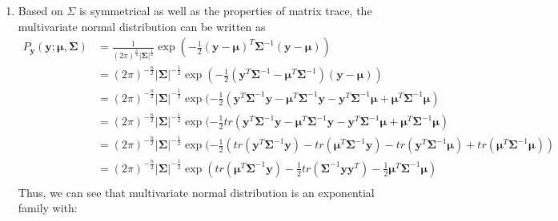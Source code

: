 \documentclass[a4paper]{article}
\begin{document}
\begin{enumerate}
\item Based on $\Sigma$ is symmetrical as well as the properties of matrix trace, the multivariate normal distribution can be written as
\begin{equation*}
  \begin{aligned}
    P_{\boldsymbol y}(\boldsymbol y;\boldsymbol \mu,\boldsymbol \Sigma)
    &= \frac{1}{(2\pi)^{\frac{n}{2}}|\boldsymbol \Sigma|^{\frac{1}{2}}} \exp(-\frac{1}{2}(\boldsymbol{y}-\boldsymbol \mu)^T {\boldsymbol \Sigma}^{-1}(\boldsymbol y-\boldsymbol \mu))\\
    &= (2\pi)^{-\frac{n}{2}}|\boldsymbol \Sigma|^{-\frac{1}{2}} \exp(-\frac{1}{2}(\boldsymbol{y}^T{\boldsymbol \Sigma}^{-1}-\boldsymbol{\mu}^T{\boldsymbol \Sigma}^{-1}) (\boldsymbol{y}-\boldsymbol{\mu}))\\
    &= (2\pi)^{-\frac{n}{2}}|\boldsymbol \Sigma|^{-\frac{1}{2}} \exp(-\frac{1}{2}(\boldsymbol{y}^T{\boldsymbol \Sigma}^{-1} \boldsymbol{y}-\boldsymbol{\mu}^T{\boldsymbol \Sigma}^{-1}\boldsymbol{y} - \boldsymbol{y}^T{\boldsymbol \Sigma}^{-1} \boldsymbol{\mu} + \boldsymbol{\mu}^T{\boldsymbol \Sigma}^{-1}\boldsymbol{\mu})\\
    &= (2\pi)^{-\frac{n}{2}}|\boldsymbol \Sigma|^{-\frac{1}{2}} \exp(-\frac{1}{2} tr(\boldsymbol{y}^T{\boldsymbol \Sigma}^{-1} \boldsymbol{y}-\boldsymbol{\mu}^T{\boldsymbol \Sigma}^{-1}\boldsymbol{y} - \boldsymbol{y}^T{\boldsymbol \Sigma}^{-1} \boldsymbol{\mu} + \boldsymbol{\mu}^T{\boldsymbol \Sigma}^{-1}\boldsymbol{\mu})\\
    &= (2\pi)^{-\frac{n}{2}}|\boldsymbol \Sigma|^{-\frac{1}{2}} \exp(-\frac{1}{2} (tr(\boldsymbol{y}^T{\boldsymbol \Sigma}^{-1} \boldsymbol{y})-tr(\boldsymbol{\mu}^T{\boldsymbol \Sigma}^{-1}\boldsymbol{y}) - tr(\boldsymbol{y}^T{\boldsymbol \Sigma}^{-1} \boldsymbol{\mu}) + tr(\boldsymbol{\mu}^T{\boldsymbol \Sigma}^{-1}\boldsymbol{\mu}))\\
    &= (2\pi)^{-\frac{n}{2}}|\boldsymbol \Sigma|^{-\frac{1}{2}} \exp(tr(\boldsymbol{\mu}^T{\boldsymbol \Sigma}^{-1}\boldsymbol{y}) -\frac{1}{2}tr({\boldsymbol \Sigma}^{-1} \boldsymbol{y} \boldsymbol{y}^T)-\frac{1}{2} \boldsymbol{\mu}^T{\boldsymbol \Sigma}^{-1}\boldsymbol{\mu})\\
  \end{aligned}
\end{equation*}
Thus, we can see that multivariate normal distribution is an exponential family with:
\begin{equation*}
  \begin{aligned}

\end{aligned}
\end{equation*}
\end{enumerate}
\end{document}
